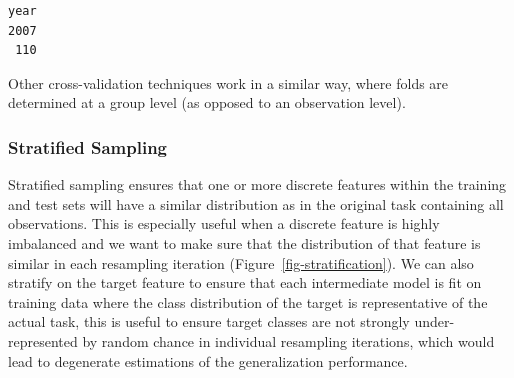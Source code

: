 \begin{Shaded}
\begin{Highlighting}[]
\SpecialCharTok{$}\NormalTok{(}\SpecialCharTok{$}\NormalTok{(}\NormalTok{), } \NormalTok{))}
\end{Highlighting}
\end{Shaded}

\begin{verbatim}
year
2007 
 110 
\end{verbatim}

Other cross-validation techniques work in a similar way, where folds are
determined at a group level (as opposed to an observation level).

\hypertarget{stratified-sampling}{%
\subsubsection*{\texorpdfstring{Stratified
Sampling}{Stratified Sampling}}\label{stratified-sampling}}

Stratified sampling ensures that one or more discrete features within
the training and test sets will have a similar distribution as in the
original task containing all observations. This is especially useful
when a discrete feature is highly imbalanced and we want to make sure
that the distribution of that feature is similar in each resampling
iteration (Figure~\ref{fig-stratification}). We can also stratify on the
target feature to ensure that each intermediate model is fit on training
data where the class distribution of the target is representative of the
actual task, this is useful to ensure target classes are not strongly
under-represented by random chance in individual resampling iterations,
which would lead to degenerate estimations of the generalization
performance.

